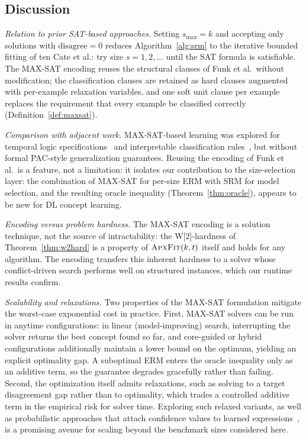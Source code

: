 \documentclass[accepted]{uai2026} %
\theoremstyle{definition}
\theoremstyle{remark}
\newcommand{\AF}{\textsc{ApxFit}}
\newcommand{\disagree}{\mathrm{disagree}}
\begin{document}
\subsection{Discussion}\label{sec:algorithm:discussion}

\emph{Relation to prior SAT-based approaches.}
Setting $s_{\max} = k$ and accepting only solutions with
$\disagree = 0$ reduces Algorithm~\ref{alg:srm} to the
iterative bounded fitting of ten Cate et al.: try size
$s = 1, 2, \ldots$ until the SAT formula is satisfiable.
The MAX-SAT encoding reuses the
structural clauses of Funk et al.\ without
modification; the classification clauses are retained as hard
clauses augmented with per-example relaxation variables, and one
soft unit clause per example replaces the requirement that every
example be classified correctly (Definition~\ref{def:maxsat}).

\emph{Comparison with adjacent work.}
MAX-SAT-based learning was explored for temporal logic
specifications~\citep{DBLP:conf/atva/GaglioneNRTX21} and
interpretable classification
rules~\citep{DBLP:conf/cp/MaliotovM18}, but without formal
PAC-style generalization guarantees. Reusing
the encoding of Funk et al.\ is a feature,
not a limitation: it isolates our contribution to the
size-selection layer: the combination of
MAX-SAT for per-size ERM with SRM for model selection, and the
resulting oracle inequality (Theorem~\ref{thm:oracle}), appears to
be new for DL concept learning.

\emph{Encoding versus problem hardness.}
The MAX-SAT encoding is a solution technique, not
the source of intractability: the W[2]-hardness of
Theorem~\ref{thm:w2hard} is a property of $\AF(k,t)$ itself and
holds for any algorithm. The encoding transfers this inherent
hardness to a solver whose conflict-driven search performs well
on structured instances, which our runtime
results confirm.

\emph{Scalability and relaxations.}
Two properties of the MAX-SAT formulation mitigate the
worst-case exponential cost in practice. First, MAX-SAT solvers can
be run in anytime configurations: in linear (model-improving)
search, interrupting the solver returns the best concept found so
far, and core-guided or hybrid configurations additionally
maintain a lower bound on the optimum, yielding an explicit
optimality gap. A suboptimal ERM enters the oracle inequality
only as an additive term, so the guarantee degrades gracefully
rather than failing. Second, the optimization itself admits
relaxations, such as solving to a target disagreement gap rather
than to optimality,
which trades a controlled additive term in the empirical risk
for solver time. Exploring such relaxed variants, as well as
probabilistic approaches that attach confidence values to learned
expressions~\citep{DBLP:journals/ml/LehmannH10}, is a promising
avenue for scaling beyond the benchmark sizes considered here.
\end{document}
